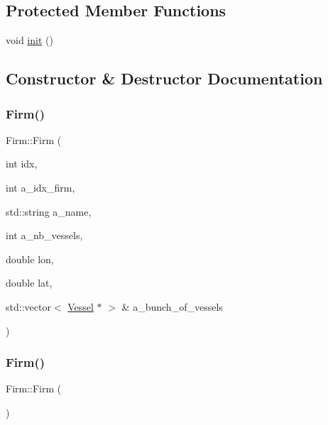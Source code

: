 \subsection*{Protected Member Functions}
\begin{DoxyCompactItemize}
\item 
void \mbox{\hyperlink{class_firm_a4aaf2d43d344346ebc74f31f0f590f05}{init}} ()
\end{DoxyCompactItemize}


\subsection{Constructor \& Destructor Documentation}
\mbox{\label{class_firm_acca90c8d721fe1b1b52a5004452a86e3}} 
\subsubsection{\texorpdfstring{Firm()}{Firm()}\hspace{0.1cm}{\footnotesize\ttfamily [1/2]}}
{\footnotesize\ttfamily Firm\+::\+Firm (\begin{DoxyParamCaption}\item[{int}]{idx,  }\item[{int}]{a\+\_\+idx\+\_\+firm,  }\item[{std\+::string}]{a\+\_\+name,  }\item[{int}]{a\+\_\+nb\+\_\+vessels,  }\item[{double}]{lon,  }\item[{double}]{lat,  }\item[{std\+::vector$<$ \mbox{\hyperlink{class_vessel}{Vessel}} $\ast$ $>$ \&}]{a\+\_\+bunch\+\_\+of\+\_\+vessels }\end{DoxyParamCaption})}

\mbox{\label{class_firm_a06e2aafef1de84e86cec448f162a8e95}} 
\subsubsection{\texorpdfstring{Firm()}{Firm()}\hspace{0.1cm}{\footnotesize\ttfamily [2/2]}}
{\footnotesize\ttfamily Firm\+::\+Firm (\begin{DoxyParamCaption}{ }\end{DoxyParamCaption})}

